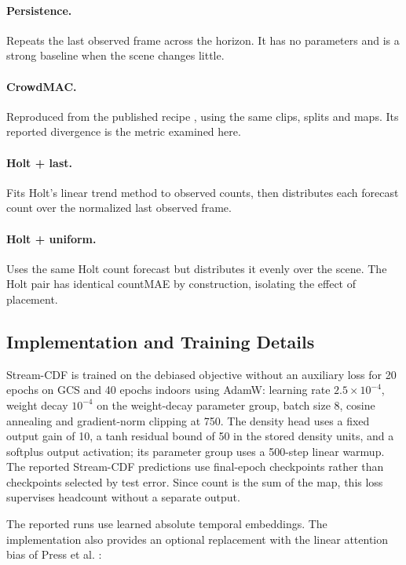 \documentclass{article}
\begin{document}
\paragraph{Persistence.} Repeats the last observed frame across the horizon. It has no parameters and is a strong baseline when the scene changes little.

\paragraph{CrowdMAC.} Reproduced from the published recipe \cite{fujii2025}, using the same clips, splits and maps. Its reported divergence is the metric examined here.

\paragraph{Holt + last.} Fits Holt's linear trend method \cite{holt2004} to observed counts, then distributes each forecast count over the normalized last observed frame.

\paragraph{Holt + uniform.} Uses the same Holt count forecast but distributes it evenly over the scene. The Holt pair has identical countMAE by construction, isolating the effect of placement.

\subsection{Implementation and Training Details}
\label{sec:setup-training}

Stream-CDF is trained on the debiased objective without an auxiliary loss for 20 epochs on GCS and 40 epochs indoors using AdamW: learning rate $2.5 \times 10^{-4}$, weight decay $10^{-4}$ on the weight-decay parameter group, batch size 8, cosine annealing and gradient-norm clipping at 750. The density head uses a fixed output gain of 10, a tanh residual bound of 50 in the stored density units, and a softplus output activation; its parameter group uses a 500-step linear warmup. The reported Stream-CDF predictions use final-epoch checkpoints rather than checkpoints selected by test error. Since count is the sum of the map, this loss supervises headcount without a separate output.

The reported runs use learned absolute temporal embeddings. The implementation also provides an optional replacement with the linear attention bias of Press et al. \cite{press2022alibi}:
\end{document}
